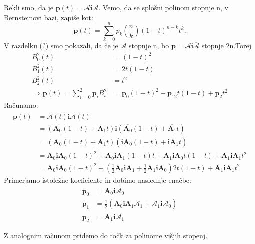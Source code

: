 \documentclass[mat1]{fmfdelo}
\newcommand{\ii}{\boldsymbol i}
\newcommand{\pp}{\boldsymbol p}
\newcommand{\ba}{\boldsymbol A}
\newcommand{\A}{\mathcal A}
\begin{document}
\begin{primer}
Rekli smo, da je $\pp(t) = \A \ii \overline{\A}$. Vemo, da se splošni polinom stopnje n, v Bernsteinovi bazi, zapiše kot:
\begin{equation*}
\pp(t) = \sum_{k=0}^n p_k \binom{n}{k}(1-t)^{n-k}t^k.
\end{equation*}
V razdelku (?) smo pokazali, da če je $\A$ stopnje n, bo $\pp = \A\ii\overline{\A}$ stopnje 2n.Torej
\begin{equation*}
\begin{split}
B_0^2(t)& = (1-t)^2\\
B_1^2(t) &= 2t(1-t)\\
B_2^2(t) &= t^2 \\
\Longrightarrow \pp(t) = \sum_{i=0}^2 \pp_i B_i^2 &= \pp_0 (1-t)^2 + \pp_12t(1-t) + \pp_2t^2
\end{split}
\end{equation*}
Računamo:
\begin{equation*}
\begin{split}
\pp(t) &= \A(t)\ii\overline{\A(t)} \\
&= (\boldsymbol{A}_0(1-t) + \boldsymbol{A}_1t) \ii ( \overline{\boldsymbol{A}_0}(1-t) + \overline{\boldsymbol{A}_1}t) \\
& = (\boldsymbol{A}_0(1-t) + \boldsymbol{A}_1t) (\ii\overline{\boldsymbol{A}_0}(1-t) + \ii\overline{\boldsymbol{A}_1}t) \\
&=\ba_0 \ii \overline{\ba_0} (1-t)^2 + \ba_0\ii\overline{\ba_1}(1-t)t + \ba_1\ii\overline{\ba_0}t(1-t) + \ba_1\ii\overline{\ba_1}t^2 \\
&= \ba_0 \ii \overline{\ba_0} (1-t)^2 + \left(\frac{1}{2}\ba_0\ii\overline{\ba_1} +\frac{1}{2} \ba_1\ii\overline{\ba_0}\right)2t(1-t) + \ba_1\ii\overline{\ba_1}t^2
\end{split}
\end{equation*}
Primerjamo istoležne koeficiente in dobimo naslednje enačbe:
\begin{equation*}
\begin{split}
\pp_0&= \ba_0\ii\overline{\A_0} \\
\pp_1&= \frac{1}{2}\left( \ba_0\ii\ba_1\overline{\A_1} + \A_1\ii\overline{\A_0}\right)\\
\pp_2&= \ba_1\ii\overline{\A_1}\end{split}
\end{equation*}
\end{primer}
Z analognim računom pridemo do točk za polinome višjih stopenj.
\end{document}
